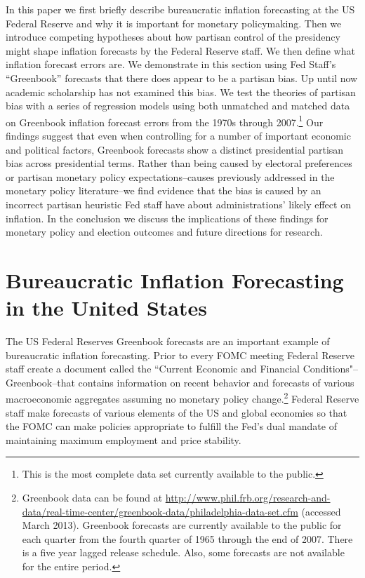 \documentclass[a4paper]{article}\usepackage{graphicx, color}
\begin{document}
In this paper we first briefly describe bureaucratic inflation forecasting at the US Federal Reserve and why it is important for monetary policymaking. Then we introduce competing hypotheses about how partisan control of the presidency might shape inflation forecasts by the Federal Reserve staff. We then define what inflation forecast errors are. We demonstrate in this section using Fed Staff's ``Greenbook'' forecasts that there does appear to be a partisan bias. Up until now academic scholarship has not examined this bias. We test the theories of partisan bias with a series of regression models using both unmatched and matched data on Greenbook inflation forecast errors from the 1970s through 2007.\footnote{This is the most complete data set currently available to the public.} Our findings suggest that even when controlling for a number of important economic and political factors, Greenbook forecasts show a distinct presidential partisan bias across presidential terms. Rather than being caused by electoral preferences or partisan monetary policy expectations--causes previously addressed in the monetary policy literature--we find evidence that the bias is caused by an incorrect partisan heuristic Fed staff have about administrations' likely effect on inflation. In the conclusion we discuss the implications of these findings for monetary policy and election outcomes and future directions for research.


\section{Bureaucratic Inflation Forecasting in the United States}

The US Federal Reserves Greenbook forecasts are an important example of bureaucratic inflation forecasting. Prior to every FOMC meeting Federal Reserve staff create a document called the ``Current Economic and Financial Conditions"--Greenbook--that contains information on recent behavior and forecasts of various macroeconomic aggregates assuming no monetary policy change.\footnote{Greenbook data can be found at {\url{http://www.phil.frb.org/research-and-data/real-time-center/greenbook-data/philadelphia-data-set.cfm}} (accessed March 2013). Greenbook forecasts are currently available to the public for each quarter from the fourth quarter of 1965 through the end of 2007. There is a five year lagged release schedule. Also, some forecasts are not available for the entire period.} Federal Reserve staff make forecasts of various elements of the US and global economies so that the FOMC can make policies appropriate to fulfill the Fed's dual mandate of maintaining maximum employment and price stability. 
\end{document}
